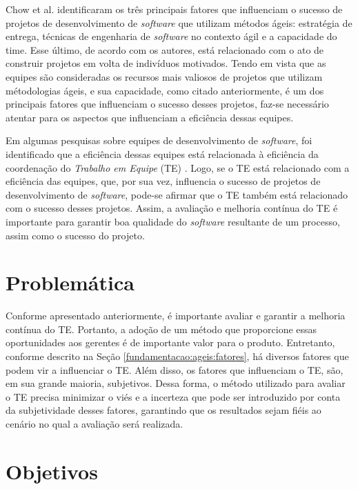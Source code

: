 Chow et al. \cite{chow} identificaram os três principais fatores que influenciam o sucesso de projetos de desenvolvimento de \textit{software} que utilizam métodos ágeis: estratégia de entrega, técnicas de engenharia de \textit{software} no contexto ágil e a capacidade do time. Esse último, de acordo com os autores, está relacionado com o ato de construir projetos em volta de indivíduos motivados. Tendo em vista que as equipes são consideradas os recursos mais valiosos de projetos que utilizam métodologias ágeis, e sua capacidade, como citado anteriormente, é um dos principais fatores que influenciam o sucesso desses projetos, faz-se necessário atentar para os aspectos que influenciam a eficiência dessas equipes.

Em algumas pesquisas sobre equipes de desenvolvimento de \textit{software}, foi identificado que a eficiência dessas equipes está relacionada à eficiência da coordenação do \textit{Trabalho em Equipe} (TE) \cite{kraut} \cite{hoegl}. Logo, se o TE está relacionado com a eficiência das equipes, que, por sua vez, influencia o sucesso de projetos de desenvolvimento de \textit{software}, pode-se afirmar que o TE também está relacionado com o sucesso desses projetos. Assim, a avaliação e melhoria contínua do TE é importante para garantir boa qualidade do \textit{software} resultante de um processo, assim como o sucesso do projeto.

\section{Problemática}
\label{introducao:problematica}

Conforme apresentado anteriormente, é importante avaliar e garantir a melhoria contínua do TE. Portanto, a adoção de um método que proporcione essas oportunidades aos gerentes é de importante valor para o produto. Entretanto, conforme descrito na Seção \ref{fundamentacao:ageis:fatores}, há diversos fatores que podem vir a influenciar o TE. Além disso, os fatores que influenciam o TE, são, em sua grande maioria, subjetivos. Dessa forma, o método utilizado para avaliar o TE precisa minimizar o viés e a incerteza que pode ser introduzido por conta da subjetividade desses fatores, garantindo que os resultados sejam fiéis ao cenário no qual a avaliação será realizada.

\section{Objetivos}
\label{introducao:objetivos}

